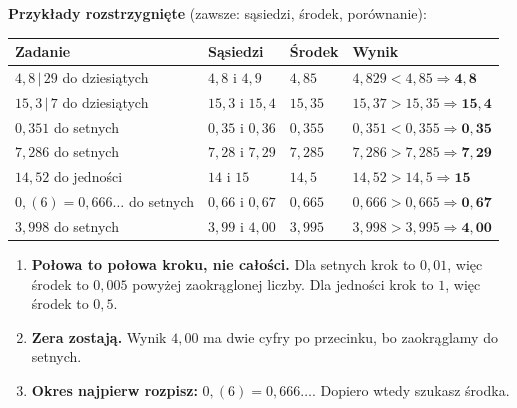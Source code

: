 \documentclass[11pt,a4paper]{article}
\begin{document}
\vspace{0.3em}
\textbf{Przykłady rozstrzygnięte} (zawsze: sąsiedzi, środek, porównanie):
\begin{center}
\renewcommand{\arraystretch}{1.4}
\begin{tabular}{@{}llll@{}}
\toprule
Zadanie & Sąsiedzi & Środek & Wynik \\
\midrule
$4{,}8\,|\,29$ do dziesiątych & $4{,}8$ i $4{,}9$ & $4{,}85$ & $4{,}829<4{,}85\Rightarrow \mathbf{4{,}8}$ \\
$15{,}3\,|\,7$ do dziesiątych & $15{,}3$ i $15{,}4$ & $15{,}35$ & $15{,}37>15{,}35\Rightarrow \mathbf{15{,}4}$ \\
$0{,}351$ do setnych & $0{,}35$ i $0{,}36$ & $0{,}355$ & $0{,}351<0{,}355\Rightarrow \mathbf{0{,}35}$ \\
$7{,}286$ do setnych & $7{,}28$ i $7{,}29$ & $7{,}285$ & $7{,}286>7{,}285\Rightarrow \mathbf{7{,}29}$ \\
$14{,}52$ do jedności & $14$ i $15$ & $14{,}5$ & $14{,}52>14{,}5\Rightarrow \mathbf{15}$ \\
$0{,}(6)=0{,}666\ldots$ do setnych & $0{,}66$ i $0{,}67$ & $0{,}665$ & $0{,}666>0{,}665\Rightarrow \mathbf{0{,}67}$ \\
$3{,}998$ do setnych & $3{,}99$ i $4{,}00$ & $3{,}995$ & $3{,}998>3{,}995\Rightarrow \mathbf{4{,}00}$ \\
\bottomrule
\end{tabular}
\end{center}

\begin{pulapka}
\begin{enumerate}[leftmargin=*, itemsep=2pt]
  \item \textbf{Połowa to połowa kroku, nie całości.} Dla setnych krok to $0{,}01$, więc środek to $0{,}005$ powyżej zaokrąglonej liczby. Dla jedności krok to $1$, więc środek to $0{,}5$.
  \item \textbf{Zera zostają.} Wynik $4{,}00$ ma dwie cyfry po przecinku, bo zaokrąglamy do setnych.
  \item \textbf{Okres najpierw rozpisz:} $0{,}(6)=0{,}666\ldots$. Dopiero wtedy szukasz środka.
\end{enumerate}
\end{pulapka}
\end{document}
